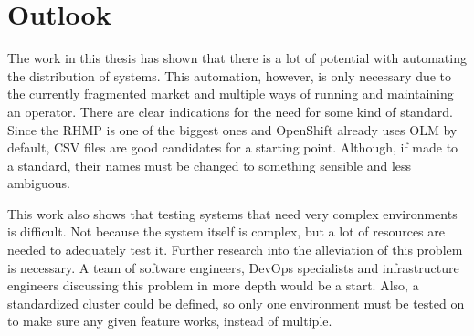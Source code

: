 \chapter{Outlook}\label{ch:outlook}

The work in this thesis has shown that there is a lot of potential with automating the distribution of systems.
This automation, however, is only necessary due to the currently fragmented market and multiple ways of running and maintaining an operator.
There are clear indications for the need for some kind of standard.
Since the RHMP is one of the biggest ones and OpenShift already uses OLM by default, CSV files are good candidates for a starting point.
Although, if made to a standard, their names must be changed to something sensible and less ambiguous.

This work also shows that testing systems that need very complex environments is difficult.
Not because the system itself is complex, but a lot of resources are needed to adequately test it.
Further research into the alleviation of this problem is necessary.
A team of software engineers, DevOps specialists and infrastructure engineers discussing this problem in more depth would be a start.
Also, a standardized cluster could be defined, so only one environment must be tested on to make sure any given feature works, instead of multiple.
